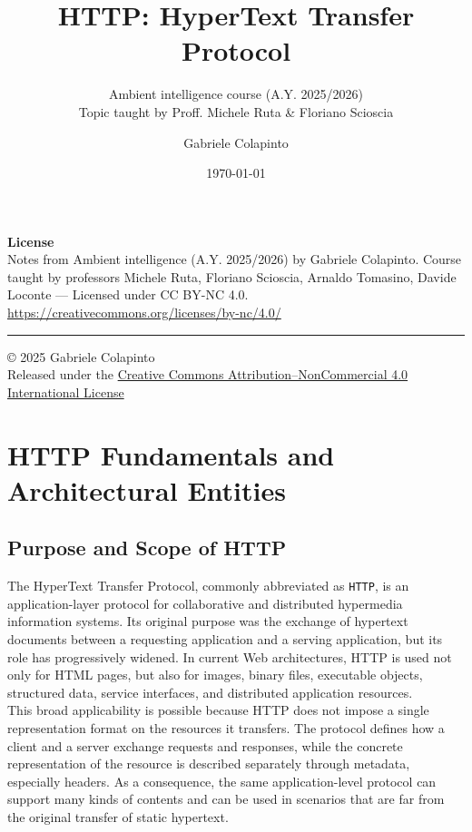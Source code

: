 \documentclass{scrbook}
\title{HTTP: HyperText Transfer Protocol}
\subtitle{Ambient intelligence course (A.Y. 2025/2026)\\Topic taught by Proff. Michele Ruta \& Floriano Scioscia}
\author{Gabriele Colapinto}
\date{\today}
\begin{document}
	
	\maketitle
	\thispagestyle{empty}
	
	{\Large\textbf{License}} \\
	{Notes from Ambient intelligence (A.Y. 2025/2026) by Gabriele Colapinto. 
		Course taught by professors Michele Ruta, Floriano Scioscia, Arnaldo Tomasino, Davide Loconte — 
		Licensed under CC BY-NC 4.0.\\
		\url{https://creativecommons.org/licenses/by-nc/4.0/}}
	
	\vspace*{\fill}
	\rule{\textwidth}{0.2pt}
	\small{© 2025 Gabriele Colapinto \\
		Released under the \href{https://creativecommons.org/licenses/by-nc/4.0/}{Creative Commons Attribution–NonCommercial 4.0 International License}}
	
	\clearpage
	
	\tableofcontents

\chapter{HTTP Fundamentals and Architectural Entities}

\section{Purpose and Scope of HTTP}

The HyperText Transfer Protocol, commonly abbreviated as \texttt{HTTP}, is an application-layer protocol for collaborative and distributed hypermedia information systems. Its original purpose was the exchange of hypertext documents between a requesting application and a serving application, but its role has progressively widened. In current Web architectures, HTTP is used not only for HTML pages, but also for images, binary files, executable objects, structured data, service interfaces, and distributed application resources.\\

This broad applicability is possible because HTTP does not impose a single representation format on the resources it transfers. The protocol defines how a client and a server exchange requests and responses, while the concrete representation of the resource is described separately through metadata, especially headers. As a consequence, the same application-level protocol can support many kinds of contents and can be used in scenarios that are far from the original transfer of static hypertext.\\
\end{document}
